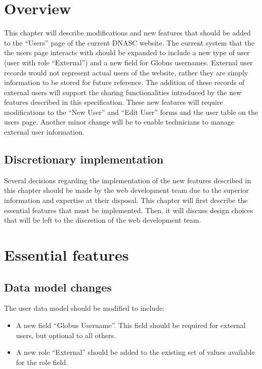 \section{Overview}

This chapter will describe modifications and new features that should be added to the
``Users'' page of the current DNASC website. The current system that the the users 
page interacts with should be expanded to include a new type of user (user with role 
``External'') and a new field for Globus usernames. External user records would not 
represent actual users of the website, rather they are simply information to be stored 
for future reference. The addition of these records of external users will support the 
sharing functionalities introduced by the new features described in this specification.
These new features will require modifications to the ``New User'' and ``Edit User'' 
forms and the user table on the users page. Another minor change will be to enable 
technicians to manage external user information.

\subsection{Discretionary implementation}

Several decisions regarding the implementation of the new features described in this 
chapter should be made by the web development team due to the superior information and 
expertise at their disposal. This chapter will first describe the essential features 
that must be implemented. Then, it will discuss design choices that will be left to the 
discretion of the web development team.

\section{Essential features}

\subsection{Data model changes}

The user data model should be modified to include:
\begin{itemize}\itemsep1pt
    \item A new field ``Globus Username''. This field should be required for 
external users, but optional to all others.
    \item A new role ``External'' should be added to the existing set of values
    available for the role field.
\end{itemize}

